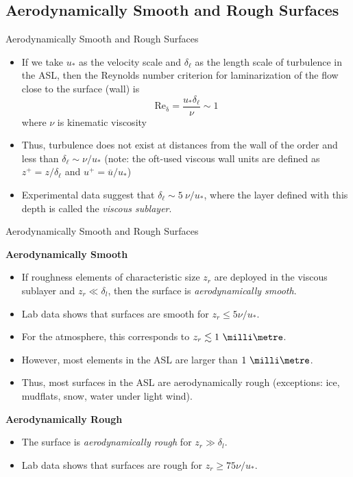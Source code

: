 \subsection{Aerodynamically Smooth and Rough Surfaces}
\begin{frame}{Aerodynamically Smooth and Rough Surfaces}

\begin{itemize}
	\item If we take $u_*$ as the velocity scale and $\delta_\ell$ as the length scale of turbulence in the ASL, then the Reynolds number criterion for laminarization of the flow close to the surface (wall) is
	$$\mathrm{Re_\delta} = \frac{u_* \delta_\ell}{\nu} \sim 1$$
	where $\nu$ is kinematic viscosity
	\item Thus, turbulence does not exist at distances from the wall of the order and less than $\delta_\ell \sim \nu/u_*$ (note: the oft-used viscous wall units are defined as $z^+ = z/\delta_\ell$ and $u^+ = \overline{u}/u_*$)
	\item Experimental data suggest that $\delta_\ell \sim 5\ \nu/u_*$, where the layer defined with this depth is called the \textit{viscous sublayer}. 
\end{itemize}
\end{frame}
\begin{frame}{Aerodynamically Smooth and Rough Surfaces}

\textbf{Aerodynamically Smooth}
\begin{itemize}
	\item If roughness elements of characteristic size $z_r$ are deployed in the viscous sublayer and $z_r \ll \delta_l$, then the surface is \textit{aerodynamically smooth}.
	\item Lab data shows that surfaces are smooth for $z_r \leq 5 \nu/u_*$.
	\item For the atmosphere, this corresponds to $z_r \lesssim 1\ \milli\metre$. 
	\item However, most elements in the ASL are larger than $1\ \milli\metre$.
	\item Thus, most surfaces in the ASL are aerodynamically rough (exceptions: ice, mudflats, snow, water under light wind).
\end{itemize}

\textbf{Aerodynamically Rough}
\begin{itemize}
	\item The surface is \textit{aerodynamically rough} for $z_r \gg \delta_l$.
	\item Lab data shows that surfaces are rough for $z_r \geq 75 \nu/u_*$.
\end{itemize}
\end{frame}
